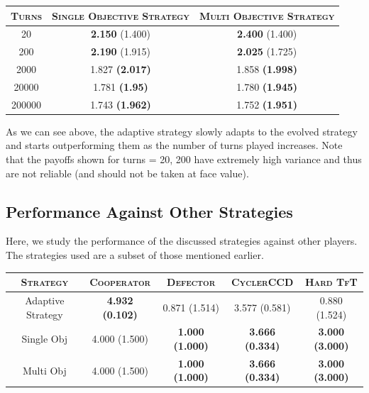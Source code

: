 \documentclass[a4paper]{article}
\begin{document}
	\begin{table}[H]
	  \begin{center}
	    \begin{tabular}{|c|c|c|}
	      \toprule
	 	  \textsc{Turns} & \textsc{Single Objective Strategy} & \textsc{Multi Objective Strategy}\\
	      \midrule
		  20    & \textbf{2.150} (1.400) & \textbf{2.400} (1.400)\\		  
		  200	& \textbf{2.190} (1.915) & \textbf{2.025} (1.725)\\
		  2000  & 1.827 \textbf{(2.017)} & 1.858 \textbf{(1.998)}\\
		  20000 & 1.781 \textbf{(1.95)} & 1.780 \textbf{(1.945)}\\
		  200000 & 1.743 \textbf{(1.962)} & 1.752 \textbf{(1.951)}\\
		\bottomrule
	    \end{tabular}
	  \end{center}
	\end{table}  		
	\vspace{-5mm}
	
	As we can see above, the adaptive strategy slowly adapts to the evolved strategy and starts outperforming them as the number of turns played increases. Note that the payoffs shown for turns = 20, 200 have extremely high variance and thus are not reliable (and should not be taken at face value).
	
	\subsection{Performance Against Other Strategies}
	
	Here, we study the performance of the discussed strategies against other players. The strategies used are a subset of those mentioned earlier.	
	
	\renewcommand{\tabcolsep}{8pt}

	\begin{table}[H]
	  \begin{center}
	    \begin{tabular}{|c|c|c|c|c|}
	      \toprule
	 	  \textsc{Strategy} & \textsc{Cooperator} & \textsc{Defector} & \textsc{CyclerCCD} & \textsc{Hard TfT}\\
		  \midrule
		  Adaptive Strategy & \textbf{4.932} \textbf{(0.102)} & 0.871 (1.514) & 3.577 (0.581) & 0.880 (1.524)\\
		  Single Obj & 4.000 (1.500) & \textbf{1.000 (1.000)} & \textbf{3.666 (0.334)} & \textbf{3.000 (3.000)}\\
		  Multi Obj & 4.000 (1.500) & \textbf{1.000 (1.000)} &  \textbf{3.666 (0.334)} & \textbf{3.000 (3.000)}\\
		\bottomrule
	    \end{tabular}
	  \end{center}
	\end{table}  		
\end{document}
